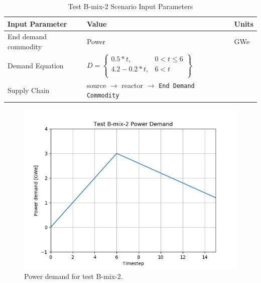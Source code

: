 \documentclass[11pt,letterpaper]{article}
\begin{document}
\begin{table}[H]
	\centering
	\caption{Test B-mix-2 Scenario Input Parameters }
	\label{tab:test_B-mix-2}
	\begin{tabular}{|l|l|l|}
		\hline
		\textbf{Input Parameter} & \textbf{Value} & \textbf{Units} \\
		\hline
		End demand commodity & Power & GWe \\
		Demand Equation & $D = \left\{
		\begin{array}{ll}
		0.5 * t , & 0 < t \leq 6 \\
		4.2 - 0.2 *t, &  6 < t  \\
		\end{array}\right\}$ & \\
		Supply Chain & source $\rightarrow$ reactor $\rightarrow$ \texttt{End Demand Commodity} &  \\
		\hline
	\end{tabular}
\end{table}

\begin{figure}[H]
	\begin{center}
		\includegraphics[scale=0.7]{./images/B-mix-2.png}
	\end{center}
	\caption{Power demand for test B-mix-2.}
	\label{fig:B-dep-2}
\end{figure}
\end{document}
